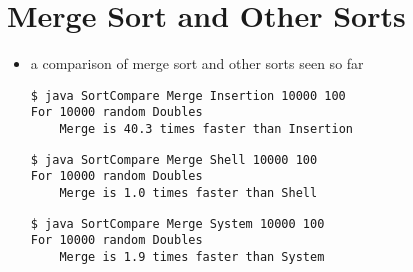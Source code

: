 \documentclass[8pt,a4paper,compress]{beamer}
\begin{document}
\section{Merge Sort and Other Sorts}
\begin{frame}[fragile]
\begin{itemize}
\item a comparison of merge sort and other sorts seen so far
\begin{lstlisting}[language={}]
$ java SortCompare Merge Insertion 10000 100
For 10000 random Doubles
    Merge is 40.3 times faster than Insertion
\end{lstlisting}

\begin{lstlisting}[language={}]
$ java SortCompare Merge Shell 10000 100
For 10000 random Doubles
    Merge is 1.0 times faster than Shell
\end{lstlisting}

\begin{lstlisting}[language={}]
$ java SortCompare Merge System 10000 100
For 10000 random Doubles
    Merge is 1.9 times faster than System
\end{lstlisting}
\end{itemize}
\end{frame}
\end{document}
